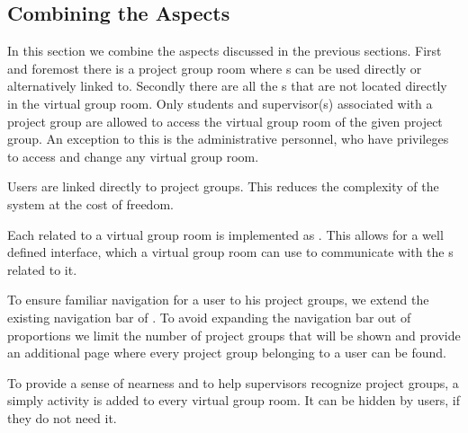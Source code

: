 \subsection{Combining the Aspects}
In this section we combine the aspects discussed in the previous sections.
First and foremost there is a project group room where \detdeandrelaver[]s can be used directly or alternatively linked to.
Secondly there are all the \detdeandrelaver[]s that are not located directly in the virtual group room.
Only students and supervisor(s) associated with a project group are allowed to access the virtual group room of the given project group.
An exception to this is the administrative personnel, who have privileges to access and change any virtual group room.

Users are linked directly to project groups.
This reduces the complexity of the system at the cost of freedom.

Each \detdeandrelaver{} related to a virtual group room is implemented as \block{}.
This allows for a well defined interface, which a virtual group room can use to communicate with the \detdeandrelaver[]s related to it.

To ensure familiar navigation for a user to his project groups, we extend the existing navigation bar of \moodle{}.
To avoid expanding the navigation bar out of proportions we limit the number of project groups that will be shown and provide an additional page where every project group belonging to a user can be found.

To provide a sense of nearness and to help supervisors recognize project groups, a simply activity is added to every virtual group room.
It can be hidden by users, if they do not need it.













\FloatBarrier